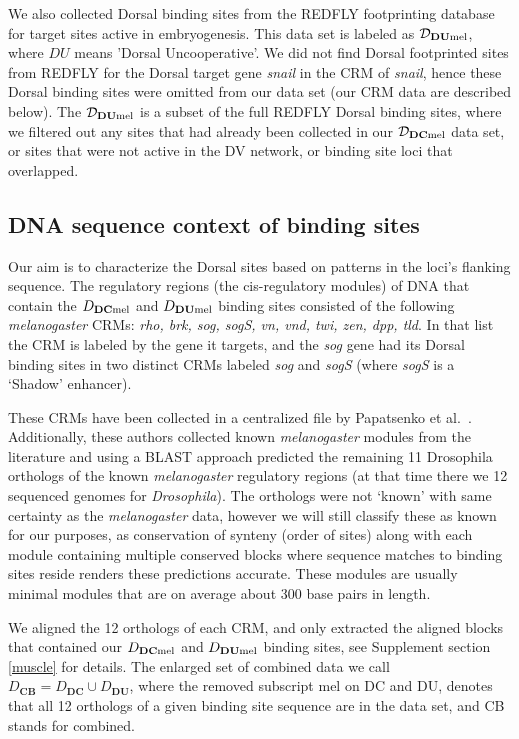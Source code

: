 We also collected Dorsal binding sites from the REDFLY footprinting database~\cite{Gallo21102010} for target sites active in embryogenesis.  This data set is labeled as $\mathcal D_{\textbf{DU}\rm{mel}}$, where $DU$ means 'Dorsal Uncooperative'. We did not find Dorsal footprinted sites from REDFLY for the Dorsal target gene \textit{snail} in the CRM of \textit{snail}, hence these Dorsal binding sites were omitted from our data set (our CRM data are described below).   The $\mathcal D_{\textbf{DU}\rm{mel}}$ is a subset of the full REDFLY Dorsal binding sites, where we filtered out any sites that had already been collected in our $\mathcal D_{\textbf{DC}\rm{mel}}$ data set, or sites that were not active in the DV network, or binding site loci that overlapped.

\subsection{DNA sequence context of binding sites}
Our aim is to characterize the Dorsal sites based on patterns in the loci's flanking sequence.  The regulatory regions (the cis-regulatory modules) of DNA that contain the $D_{\textbf{DC}\rm{mel}}$ and $D_{\textbf{DU}\rm{mel}}$ binding sites consisted of the following \textit{melanogaster} CRMs: \textit{rho, brk, sog, sogS, vn, vnd, twi, zen, dpp, tld}. In that list the CRM is labeled by the gene it targets, and the \textit{sog} gene had its Dorsal binding sites in two distinct CRMs labeled \textit{sog} and \textit{sogS} (where \textit{sogS} is a `Shadow' enhancer).

These CRMs have been collected in a centralized file by Papatsenko et al.~\cite{pmid19651877}.  Additionally, these authors collected known \textit{melanogaster} modules from the literature and using a BLAST approach predicted the remaining 11 Drosophila orthologs of the known \textit{melanogaster} regulatory regions (at that time there we 12 sequenced genomes for \textit{Drosophila}).  The orthologs were not `known' with same certainty as the \textit{melanogaster} data, however we will still classify these as known for our purposes, as conservation of synteny (order of sites) along with each module containing multiple conserved blocks where sequence matches to binding sites reside renders these predictions accurate.  These modules are usually minimal modules that are on average about 300 base pairs in length.

We aligned the 12 orthologs of each CRM, and only extracted the aligned blocks that contained our $D_{\textbf{DC}\rm{mel}}$ and $D_{\textbf{DU}\rm{mel}}$ binding sites, see Supplement section \ref{muscle} for details.  The enlarged set of combined data we call $D_{\textbf{CB}}=D_{\textbf{DC}} \cup D_{\textbf{DU}}$, where the removed subscript mel on DC and DU, denotes that all 12 orthologs of a given binding site sequence are in the data set, and CB stands for combined.  
	
